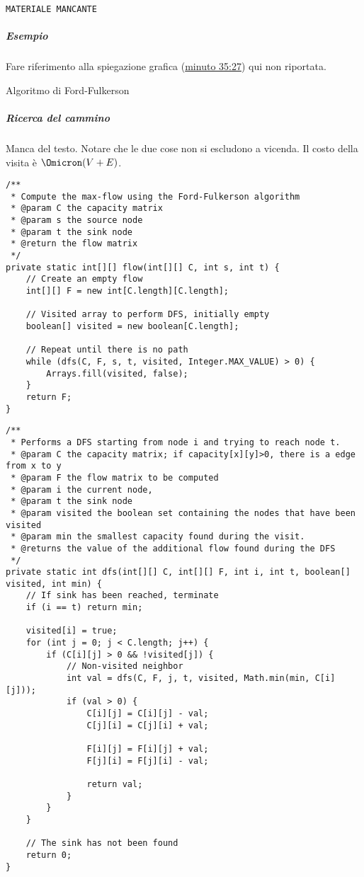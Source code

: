 \texttt{MATERIALE MANCANTE}

\subparagraph{Esempio}
Fare riferimento alla spiegazione grafica (\href{https://youtu.be/rxH0SEakE2Y?t=2127}{minuto 35:27}) qui non riportata.

\begin{algorithm}[H]
	\caption{Algoritmo di Ford-Fulkerson}
	
\end{algorithm}

\subparagraph{Ricerca del cammino}
Manca del testo.
Notare che le due cose non si escludono a vicenda.
Il costo della visita è \(\Omicron(V+E)\).

\begin{code}
\begin{verbatim}
/**
 * Compute the max-flow using the Ford-Fulkerson algorithm
 * @param C the capacity matrix
 * @param s the source node
 * @param t the sink node
 * @return the flow matrix
 */
private static int[][] flow(int[][] C, int s, int t) {
	// Create an empty flow
	int[][] F = new int[C.length][C.length];

	// Visited array to perform DFS, initially empty
	boolean[] visited = new boolean[C.length];

	// Repeat until there is no path
	while (dfs(C, F, s, t, visited, Integer.MAX_VALUE) > 0) {
		Arrays.fill(visited, false);
	}
	return F;
}
\end{verbatim}
\end{code}

\begin{code}
\begin{verbatim}
/**
 * Performs a DFS starting from node i and trying to reach node t.
 * @param C the capacity matrix; if capacity[x][y]>0, there is a edge from x to y
 * @param F the flow matrix to be computed
 * @param i the current node,
 * @param t the sink node
 * @param visited the boolean set containing the nodes that have been visited
 * @param min the smallest capacity found during the visit.
 * @returns the value of the additional flow found during the DFS
 */
private static int dfs(int[][] C, int[][] F, int i, int t, boolean[] visited, int min) {
	// If sink has been reached, terminate
	if (i == t) return min;

	visited[i] = true;
	for (int j = 0; j < C.length; j++) {
		if (C[i][j] > 0 && !visited[j]) {
			// Non-visited neighbor
			int val = dfs(C, F, j, t, visited, Math.min(min, C[i][j]));
			if (val > 0) {
				C[i][j] = C[i][j] - val;
				C[j][i] = C[j][i] + val;

				F[i][j] = F[i][j] + val;
				F[j][i] = F[j][i] - val;

				return val;
			}
		}
	}

	// The sink has not been found
	return 0;
}
\end{verbatim}
\end{code}

